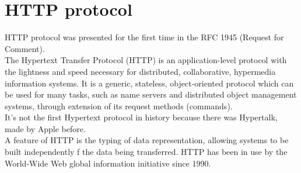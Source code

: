 \chapter{HTTP protocol}
HTTP protocol was presented for the first time in the RFC 1945\cite{RFC1945} (Request for Comment).\\
The Hypertext Transfer Protocol (HTTP) is an application-level protocol with the lightness and speed necessary for distributed, collaborative, hypermedia information systems. It is a generic, stateless, object-oriented protocol which can be used for many tasks, such as name servers and distributed object management systems, through extension of its request methods (commands).\\
It's not the first Hypertext protocol in history because there was Hypertalk, made by Apple before. \\
A feature of HTTP is the typing of data representation, allowing systems to be built independently f the data being transferred. HTTP has been in use by the World-Wide Web global information initiative since 1990.

